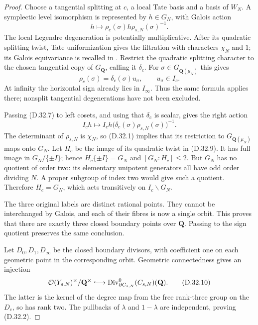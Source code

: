 \begin{proof}
Choose a tangential splitting at $c$, a local Tate basis
and a basis of $W_N$. A symplectic level isomorphism is
represented by $h\in G_N$, with Galois action
\[
 h\longmapsto
       \rho_c(\sigma)h\rho_{s,N}(\sigma)^{-1}.
 \tag{D.32.7}
\]
The local Legendre degeneration is potentially multiplicative.
After its quadratic splitting twist, Tate uniformization gives
the filtration with characters $\chi_N$ and $1$; its
Galois equivariance is recalled in
\citep[\S19, p.~44]{D_ConradModularNotes}.
Restrict the quadratic splitting character to the chosen
tangential copy of $G_{\mathbf Q}$, calling it $\delta_c$.
For $\sigma\in G_{\mathbf Q(\mu_N)}$ this gives
\[
            \rho_c(\sigma)=\delta_c(\sigma)u_\sigma,
                   \qquad u_\sigma\in I_c.
 \tag{D.32.8}
\]
At infinity the horizontal sign already lies in $I_\infty$.
Thus the same formula applies there; nonsplit tangential
degenerations have not been excluded.

Passing \textup{(D.32.7)} to left cosets, and using that
$\delta_c$ is scalar, gives the right action
\[
 I_ch\longmapsto
       I_ch\bigl(\delta_c(\sigma)\rho_{s,N}(\sigma)\bigr)^{-1}.
 \tag{D.32.9}
\]
The determinant of $\rho_{s,N}$ is $\chi_N$, so
\textup{(D.32.1)} implies that its restriction to
$G_{\mathbf Q(\mu_N)}$ maps onto $G_N$.
Let $H_c$ be the image of its quadratic twist in
\textup{(D.32.9)}. It has full image in
$G_N/\{\pm I\}$; hence $H_c\{\pm I\}=G_N$ and
$[G_N:H_c]\le2$.
But $G_N$ has no quotient of order two: its elementary
unipotent generators all have odd order dividing $N$.
A proper subgroup of index two would give such a quotient.
Therefore $H_c=G_N$, which acts transitively on
$I_c\backslash G_N$.

The three original labels are distinct rational points.
They cannot be interchanged by Galois, and each of their
fibres is now a single orbit. This proves that there are
exactly three closed boundary points over $\mathbf Q$.
Passing to the sign quotient preserves the same conclusion.

Let $D_0,D_1,D_\infty$ be the closed boundary divisors,
with coefficient one on each geometric point in the
corresponding orbit. Geometric connectedness gives an injection
\[
 \mathcal O(Y_{s,N})^\times/\mathbf Q^\times
 \lhook\joinrel\longrightarrow
 \operatorname{Div}^0_{\partial C_{s,N}}
                           (C_{s,N})(\mathbf Q).
 \tag{D.32.10}
\]
The latter is the kernel of the degree map from the free
rank-three group on the $D_c$, so has rank two.
The pullbacks of $\lambda$ and $1-\lambda$ are independent,
proving \textup{(D.32.2)}.


\end{proof}
